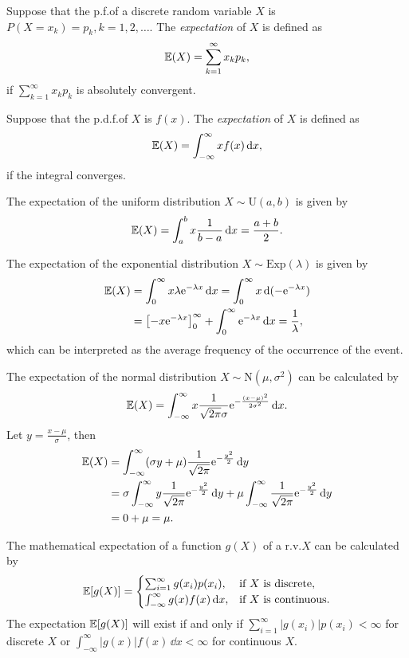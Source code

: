\begin{definition}[Expectation]
  Suppose that the p.f.\@ of a discrete random variable \(X\) is \(P(X = x_k) = p_k, k = 1, 2, \dots\). The \emph{expectation} of \(X\) is defined as
  \[
    \mathbb{E}(X) = \sum_{k = 1}^\infty x_k p_k,
  \]
  if \(\sum_{k = 1}^\infty x_k p_k\) is absolutely convergent.
\end{definition}

\begin{definition}[Expectation]
  Suppose that the p.d.f.\@ of \(X\) is \(f(x)\). The \emph{expectation} of \(X\) is defined as
  \[
    \mathbb{E}(X) = \int_{-\infty}^\infty x f(x)\,\mathrm{d} x,
  \]
  if the integral converges.
\end{definition}

The expectation of the uniform distribution \(X \sim \mathrm{U}(a, b)\) is given by
\[
  \mathbb{E}(X) = \int_a^b x \frac{1}{b - a}\,\mathrm{d} x = \frac{a + b}{2}.
\]

The expectation of the exponential distribution \(X \sim \mathrm{Exp}(\lambda)\) is given by
\begin{align*}
  \mathbb{E}(X) & = \int_0^\infty x \lambda \mathrm{e}^{-\lambda x}\,\mathrm{d} x = \int_0^\infty x\,\mathrm{d}(-\mathrm{e}^{-\lambda x}) \\
  & = \left[-x \mathrm{e}^{-\lambda x}\right]_0^\infty + \int_0^\infty \mathrm{e}^{-\lambda x}\,\mathrm{d} x = \frac{1}{\lambda},
\end{align*}
which can be interpreted as the average frequency of the occurrence of the event.

The expectation of the normal distribution \(X \sim \mathrm{N}(\mu, \sigma^2)\) can be calculated by
\[
  \mathbb{E}(X) = \int_{-\infty}^\infty x \frac{1}{\sqrt{2\mathrm{\pi}} \sigma} \mathrm{e}^{-\frac{(x - \mu)^2}{2\sigma^2}}\,\mathrm{d} x.
\]
Let \(y = \frac{x - \mu}{\sigma}\), then
\begin{align*}
  \mathbb{E}(X) & = \int_{-\infty}^\infty (\sigma y + \mu) \frac{1}{\sqrt{2\mathrm{\pi}}} \mathrm{e}^{-\frac{y^2}{2}}\,\mathrm{d} y \\
  & = \sigma \int_{-\infty}^\infty y \frac{1}{\sqrt{2\mathrm{\pi}}} \mathrm{e}^{-\frac{y^2}{2}}\,\mathrm{d} y + \mu \int_{-\infty}^\infty \frac{1}{\sqrt{2\mathrm{\pi}}} \mathrm{e}^{-\frac{y^2}{2}}\,\mathrm{d} y \\
  & = 0 + \mu = \mu.
\end{align*}

\begin{theorem}
  The mathematical expectation of a function \(g(X)\) of a r.v.\@ \(X\) can be calculated by
  \[
    \mathbb{E}[g(X)] = \begin{cases}
      \sum_{i = 1}^\infty g(x_i) p(x_i), & \text{if } X \text{ is discrete}, \\
      \int_{-\infty}^\infty g(x) f(x)\,\mathrm{d} x, & \text{if } X \text{ is continuous}.
    \end{cases}
  \]
  The expectation \(\mathbb{E}[g(X)]\) will exist if and only if \(\sum_{i = 1}^\infty |g(x_i)| p(x_i) < \infty\) for discrete \(X\) or \(\int_{-\infty}^\infty |g(x)| f(x)\,\dd x < \infty\) for continuous \(X\).
\end{theorem}

